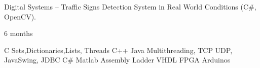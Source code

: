 \documentclass[12pt, a4paper]{cv}
\begin{document}

 \faAngleDoubleRight \space{}\newline
\begin{minipage}{0.88\linewidth}
	Digital Systems – Traffic Signs Detection System in Real World Conditions (C\#, OpenCV).
\end{minipage}\hfil\vlinee
\begin{minipage}{0.10\linewidth}
	\begin{flushright}
	6 months
	\end{flushright}
\end{minipage}

C Sets,Dictionaries,Lists, Threads 
C++
Java Multithreading, TCP UDP, JavaSwing, JDBC
C\# 
Matlab 
Assembly
Ladder
VHDL FPGA Arduinos
\end{document}
